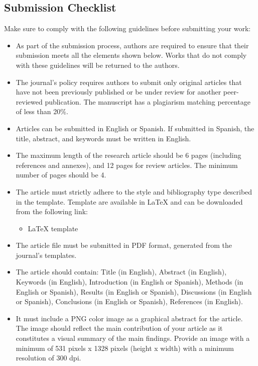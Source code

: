 \documentclass[letterpaper]{EmergentUDB}
\begin{document}
\subsection{Submission Checklist}

Make sure to comply with the following guidelines before submitting your work:

\begin{itemize}
    \item[\checkmark] As part of the submission process, authors are required to ensure that their submission meets all the elements shown below. Works that do not comply with these guidelines will be returned to the authors.
    
    \item[\checkmark] The journal's policy requires authors to submit only original articles that have not been previously published or be under review for another peer-reviewed publication. The manuscript has a plagiarism matching percentage of less than 20\%.
    
    \item[\checkmark] Articles can be submitted in English or Spanish. If submitted in Spanish, the title, abstract, and keywords must be written in English.
    
    \item[\checkmark] The maximum length of the research article should be 6 pages (including references and annexes), and 12 pages for review articles. The minimum number of pages should be 4.
    
    \item[\checkmark] The article must strictly adhere to the style and bibliography type described in the template. Template are available in LaTeX and can be downloaded from the following link:
    
    \begin{itemize}
        \item LaTeX template
    \end{itemize}
    
    \item[\checkmark] The article file must be submitted in PDF format, generated from the journal's templates.
    
    \item[\checkmark] The article should contain: Title (in English), Abstract (in English), Keywords (in English), Introduction (in English or Spanish), Methods (in English or Spanish), Results (in English or Spanish), Discussions (in English or Spanish), Conclusions (in English or Spanish), References (in English).
    
    \item[\checkmark] It must include a PNG color image as a graphical abstract for the article. The image should reflect the main contribution of your article as it constitutes a visual summary of the main findings. Provide an image with a minimum of 531 pixels x 1328 pixels (height x width) with a minimum resolution of 300 dpi.
\end{itemize}
\end{document}
